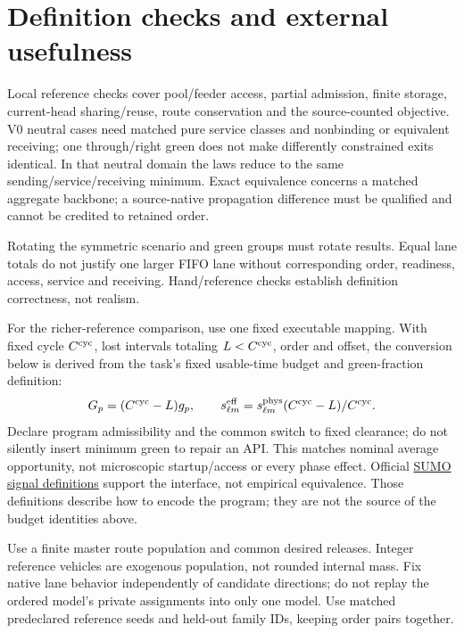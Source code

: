 \documentclass[10pt,a4paper]{article}
\newcommand{\rev}[1]{{\color{revisionred}#1}}
\begin{document}
\section{Definition checks and external usefulness}

Local reference checks cover pool/feeder access, partial admission,
finite storage, current-head
sharing/reuse, route conservation and the source-counted objective.
V0 neutral cases need matched pure service classes and nonbinding or
equivalent receiving; one through/right green does not make differently
constrained exits identical. In that neutral domain the laws reduce to
the same sending/service/receiving minimum. Exact equivalence concerns
a matched aggregate backbone; a source-native propagation difference
must be qualified and cannot be credited to retained order.

Rotating the symmetric scenario and green groups must rotate results.
Equal lane totals do not justify one larger FIFO lane without
corresponding order, readiness, access, service and receiving.
Hand/reference checks establish definition correctness, not realism.

For the richer-reference comparison, use one fixed executable mapping. With fixed cycle
$C^{\rm cyc}$, lost intervals totaling $L<C^{\rm cyc}$, order and offset,
\rev{the conversion below is derived from the task's fixed usable-time budget and green-fraction definition:}
\begin{equation}
 G_p=(C^{\rm cyc}-L)g_p,\qquad
 s^{\rm eff}_{\ell m}=s^{\rm phys}_{\ell m}
                         (C^{\rm cyc}-L)/C^{\rm cyc}.
 \label{eq:reference-action}
\end{equation}
Declare program admissibility and the common switch to fixed clearance;
do not silently insert minimum green to repair an API.
This matches nominal average opportunity, not microscopic startup/access
or every phase effect. Official
\href{https://sumo.dlr.de/docs/Simulation/Traffic_Lights.html}
{SUMO signal definitions} support the interface, not empirical equivalence.
\rev{Those definitions describe how to encode the program; they are not the source of the budget identities above.}

Use a finite master route population and common desired releases.
Integer reference vehicles are exogenous population, not rounded internal
mass. Fix native lane behavior independently of candidate directions;
do not replay the ordered model's private assignments into only one model.
Use matched predeclared reference seeds and held-out family IDs,
keeping order pairs together.
\end{document}
